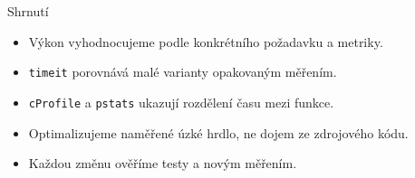 \documentclass[aspectratio=169]{beamer}
\begin{document}
\begin{frame}{Shrnutí}
\begin{itemize}
\item Výkon vyhodnocujeme podle konkrétního požadavku a metriky.
\item \texttt{timeit} porovnává malé varianty opakovaným měřením.
\item \texttt{cProfile} a \texttt{pstats} ukazují rozdělení času mezi funkce.
\item Optimalizujeme naměřené úzké hrdlo, ne dojem ze zdrojového kódu.
\item Každou změnu ověříme testy a novým měřením.
\end{itemize}
\end{frame}
\end{document}
